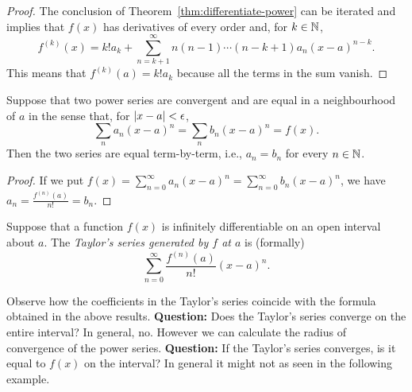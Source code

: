 \begin{proof}
  The conclusion of Theorem~\ref{thm:differentiate-power} can be iterated and implies that \(f(x)\) has derivatives of every order and, for \(k\in \mathbb{N}\),
  \[
    f^{(k)}(x) = k! a_k +  \sum_{n=k+1}^{\infty} n(n-1)\cdots (n-k+1) a_n{(x-a)}^{n-k}.
  \]
  This means that \(f^{(k)}(a) = k! a_k \) because all the terms in the sum vanish.
\end{proof}

\begin{theorem}%
  \label{thm:unique-power}
  Suppose that two power series are convergent and are equal in a neighbourhood of \(a\)
  in the sense that, for \(\left|x-a\right| < \epsilon\),
  \[
    \sum_n a_n {(x-a)}^n = \sum_n b_n {(x-a)}^n = f(x).
  \]
  Then the two series are equal term-by-term, i.e.,
  \(a_n = b_n\) for every \(n\in \mathbb{N}\).
\end{theorem}

\begin{proof}
  If we put $f(x) = \sum_{n=0}^\infty a_n {(x-a)}^n = \sum_{n=0}^\infty b_n {(x-a)}^n$,
  we have $a_n = \frac{f^{(n)}(a)}{n!} = b_n$.
\end{proof}

\begin{definition}%
  \label{def:taylor}
  Suppose that a function \(f(x)\) is infinitely differentiable on an open interval about \(a\).
  The \emph{Taylor's series generated by \(f\) at \(a\)} is (formally)
  \[
    \sum_{n=0}^{\infty} \frac{f^{(n)}(a)}{n!} {(x-a)}^{n}.
  \]
\end{definition}

Observe how the coefficients in the Taylor's series coincide with the formula obtained in the above results.
\textbf{Question:}
Does the Taylor's series converge on the entire interval?
In general, no. However we can calculate the radius of convergence of the power series.
\textbf{Question:}
If the Taylor's series converges, is it equal to \(f(x)\) on the interval?
{In general it might not as seen in the following example.}

